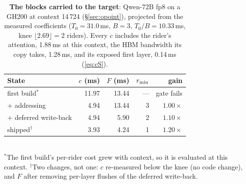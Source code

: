 \begin{table}[t]
\centering\small
\caption{\textbf{The blocks carried to the target}: Qwen-72B fp8 on a GH200 at
context 14\,724 (\S\ref{sec:opoint}), projected from the measured
coefficients ($T_0 = 31.0$\,ms, $B = 3$, $T_0/B = 10.33$\,ms, knee
$\lfloor 2.69\rfloor = 2$ riders). Every $c$ includes the rider's attention,
1.88\,ms at this context, the HBM bandwidth its copy takes, 1.28\,ms, and its
exposed first layer, 0.14\,ms (\cref{eq:cS}).}
\label{tab:ladder}
\setlength{\tabcolsep}{4pt}
\begin{tabular}{@{}l r r r r@{}}
\toprule
State & $c$ (ms) & $F$ (ms) & $r_{\min}$ & gain \\
\midrule
first build$^{*}$        & 11.97 & 13.44 & --- & gate fails \\
+ addressing             & 4.94 & 13.44 & 3 & $1.00\times$ \\
+ deferred write-back    & 4.94 &  5.90 & 2 & $1.10\times$ \\
shipped$^{\dagger}$      & 3.93 &  4.24 & 1 & $1.20\times$ \\
\bottomrule
\end{tabular}
\\[2pt]
{\footnotesize $^{*}$The first build's per-rider cost grew with context, so it
is evaluated at this context. $^{\dagger}$Two changes, not one: $c$ re-measured
below the knee (no code change), and $F$ after removing per-layer flushes of the
deferred write-back.}
\end{table}

